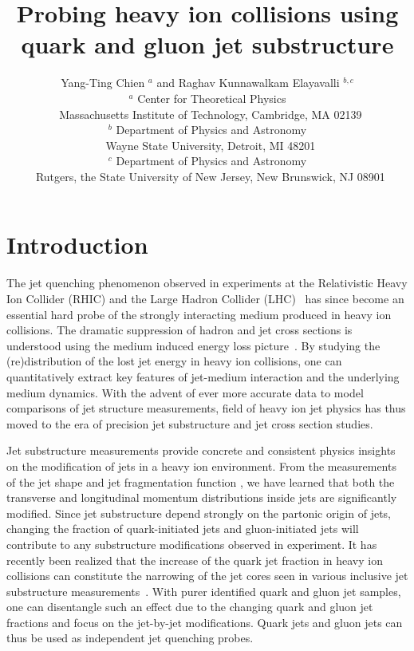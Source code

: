 \documentclass[notoc]{JHEP3}
\title{Probing heavy ion collisions using quark and gluon jet substructure}
\author{Yang-Ting Chien $^{a}$ and Raghav Kunnawalkam Elayavalli $^{b,c}$\\
$^{a}$ Center for Theoretical Physics\\
$~$ Massachusetts Institute of Technology, Cambridge, MA 02139\\
$^{b}$ Department of Physics and Astronomy\\
$~$ Wayne State University, Detroit, MI 48201\\
$^{c}$ Department of Physics and Astronomy\\
$~$ Rutgers, the State University of New Jersey, New Brunswick, NJ 08901
}
\begin{document}
\section{Introduction}
\label{sec:intro}



The jet quenching phenomenon observed in experiments at the Relativistic Heavy Ion Collider (RHIC) \cite{Adcox:2001jp,Adler:2002xw,Adcox:2004mh,Arsene:2004fa,Back:2004je,Adams:2005dq}
and the Large Hadron Collider (LHC)~\cite{Aamodt:2010jd,Abelev:2012hxa,Abelev:2013kqa,Aad:2012vca,Aad:2014bxa,Chatrchyan:2013kwa,
Chatrchyan:2012gw,Chatrchyan:2014ava,Aad:2014wha,Chatrchyan:2013exa,
Adam:2015ewa,Chatrchyan:2012gt,Chatrchyan:2011sx,Chatrchyan:2012nia,Aad:2010bu,Aad:2013sla,Adam:2015doa,Aad:2015bsa,Khachatryan:2015lha} has since become an essential hard probe of the strongly interacting medium produced in heavy ion collisions. The dramatic suppression of hadron and jet cross sections is understood using the medium induced energy loss picture~\cite{Connors:2017ptx}. By studying the (re)distribution of the lost jet energy in heavy ion collisions, one can quantitatively extract key features of jet-medium interaction and the underlying medium dynamics. With the advent of ever more accurate data to model comparisons of jet structure measurements, field of heavy ion jet physics has thus moved to the era of precision jet substructure and jet cross section studies.

Jet substructure measurements provide concrete and consistent physics insights on the modification of  jets in a heavy ion environment. From the measurements of the jet shape \cite{} and jet fragmentation function \cite{}, we have learned that both the transverse and longitudinal momentum distributions inside jets are significantly modified. Since jet substructure depend strongly on the partonic origin of jets, changing the fraction of quark-initiated jets and gluon-initiated jets will contribute to any substructure modifications observed in experiment. It has recently been realized that the increase of the quark jet fraction in heavy ion collisions can constitute the narrowing of the jet cores seen in various inclusive jet substructure measurements~\cite{}. With purer identified quark and gluon jet samples, one can disentangle such an effect due to the changing quark and gluon jet fractions and focus on the jet-by-jet modifications. Quark jets and gluon jets can thus be used as independent jet quenching probes.  
\end{document}
